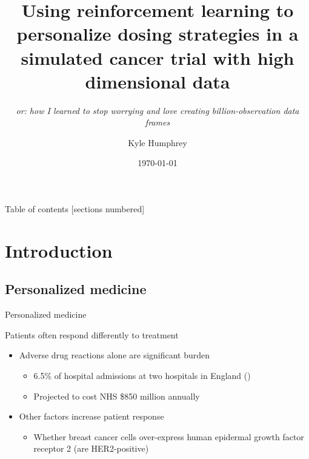 \documentclass[handout]{beamer}
\title{Using reinforcement learning to personalize dosing strategies in a simulated cancer trial with high dimensional data}
\subtitle{\sl or: how I learned to stop worrying and love creating billion-observation data frames}
\date{\today}
\author{Kyle Humphrey}
\institute{University of Arizona}
\begin{document}
\maketitle

\begin{frame}[c]{Table of contents}
  [sections numbered]
  \tableofcontents
\end{frame}

\section{Introduction}

\subsection{Personalized medicine} %
\label{sub:personalized_medicine}

\begin{frame}[c]{Personalized medicine}

Patients often respond differently to treatment
\begin{itemize}[<+(1)->]
  \item Adverse drug reactions alone are significant burden 
  \begin{itemize}
    \item 6.5\% of hospital admissions at two hospitals in England  (\cite{Pirmohamed2004})
    \item Projected to cost NHS \$850 million annually 
  \end{itemize}
  \item Other factors increase patient response
  \begin{itemize}
    \item Whether breast cancer cells over-express human epidermal growth factor receptor 2 (are HER2-positive)\footnotemark 
  \end{itemize}
\end{itemize}


\end{frame}
\end{document}
